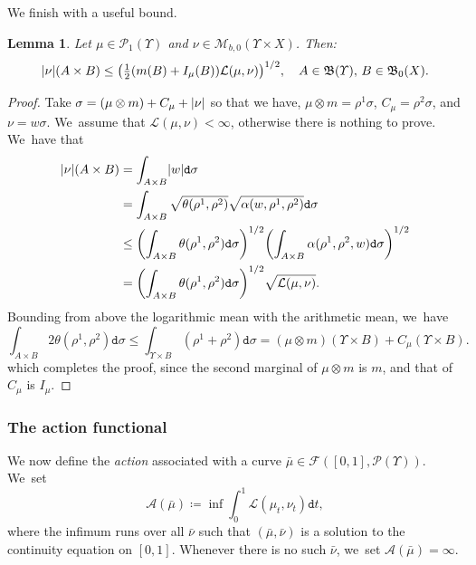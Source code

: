 \documentclass[JEP,XML,SOM,Unicode,published]{cedram}
\newtheorem{lemma}[theorem]{Lemma}
\theoremstyle{definition}
\theoremstyle{remark}
\DeclarePairedDelimiter{\paren}{\lparen}{\rparen}
\DeclarePairedDelimiter{\abs}{\lvert}{\rvert}
\begin{document}
We finish with a useful bound.
\begin{lemma}\label{t:bound-nu-lagrangian}
Let $\mu \in \mathscr{P}_{1}(\varUpsilon)$ and $\nu \in \mathscr{M}_{b,0}(\varUpsilon \times X)$.
Then:
\begin{equation*}
\abs{\nu}(A \times B) \leq \paren*{ \tfrac{1}{2} \paren*{m(B) + I_{\mu}(B)} \mathcal{L}(\mu, \nu) }^{1/2}, \quad A \in \mathfrak{B}(\varUpsilon),\, B \in \mathfrak{B}_{0}(X).
\end{equation*}
\end{lemma}

\begin{proof}
Take $\sigma = (\mu \otimes m) + C_{\mu} + \abs{\nu}$ so that we have, $\mu \otimes m = \rho^{1} \sigma$, $C_{\mu} = \rho^{2} \sigma$, and $\nu = w \sigma$. We~assume that $\mathcal{L}(\mu, \nu)<\infty$, otherwise there is nothing to prove. We~have that
\begin{align*}
|\nu|(A \times B)
&= \int_{A \times B} \abs{w} \mathtt{d} \sigma
\\
&= \int_{A \times B} \sqrt{\theta(\rho^1, \rho^2)} \sqrt{\alpha(w, \rho^1, \rho^2)} \mathtt{d} \sigma
\\
&\le \paren*{ \int_{A \times B} \theta(\rho^1, \rho^2) \mathtt{d} \sigma }^{1/2} \paren*{ \int_{A \times B} \alpha(\rho^1, \rho^2,w) \mathtt{d} \sigma }^{1/2}
\\
&= \paren*{ \int_{A \times B} \theta(\rho^1, \rho^2) \mathtt{d} \sigma }^{1/2} \sqrt{\mathcal{L}(\mu, \nu)}.
\end{align*}
Bounding from above the logarithmic mean with the arithmetic mean, we~have
\begin{equation*}
\int_{A \times B} 2\theta(\rho^1, \rho^2) \mathtt{d} \sigma
\le \int_{\varUpsilon \times B} (\rho^1+\rho^2) \mathtt{d} \sigma
= (\mu \otimes m)(\varUpsilon \times B) + C_{\mu}(\varUpsilon \times B).
\end{equation*}
which completes the proof, since the second marginal of $\mu \otimes m$ is $m$, and that of $C_{\mu}$ is $I_{\mu}$.
\end{proof}

\subsubsection{The action functional}
We now define the \emph{action} associated with a curve $\bar{\mu} \in \mathscr{F}([0,1], \mathscr{P}(\varUpsilon))$. We~set
\begin{equation*}
\mathcal{A}(\bar{\mu}) \coloneq \inf \int_{0}^{1} \mathcal{L}(\mu_{t}, \nu_{t}) \mathtt{d} t,
\end{equation*}
where the infimum runs over all $\bar{\nu}$ such that $(\bar{\mu}, \bar{\nu})$ is a solution to the continuity equation on $[0,1]$.
Whenever there is no such $\bar{\nu}$, we~set $\mathcal{A}(\bar{\mu}) = \infty$.
\end{document}
